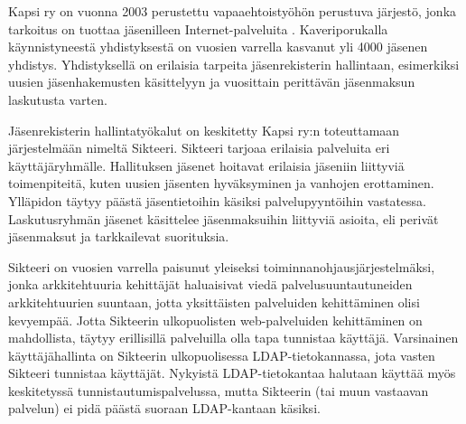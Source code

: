 Kapsi ry on vuonna 2003 perustettu vapaaehtoistyöhön perustuva järjestö, jonka tarkoitus on tuottaa jäsenilleen Internet-palveluita \cite{kapsifi}. Kaveriporukalla käynnistyneestä yhdistyksestä on vuosien varrella kasvanut yli 4000 jäsenen yhdistys. Yhdistyksellä on erilaisia tarpeita jäsenrekisterin hallintaan, esimerkiksi uusien jäsenhakemusten käsittelyyn ja vuosittain perittävän jäsenmaksun laskutusta varten.

Jäsenrekisterin hallintatyökalut on keskitetty Kapsi ry:n toteuttamaan järjestelmään nimeltä Sikteeri. Sikteeri tarjoaa erilaisia palveluita eri käyttäjäryhmälle. Hallituksen jäsenet hoitavat erilaisia jäseniin liittyviä toimenpiteitä, kuten uusien jäsenten hyväksyminen ja vanhojen erottaminen. Ylläpidon täytyy päästä jäsentietoihin käsiksi palvelupyyntöihin vastatessa. Laskutusryhmän jäsenet käsittelee jäsenmaksuihin liittyviä asioita, eli perivät jäsenmaksut ja tarkkailevat suorituksia.

Sikteeri on vuosien varrella paisunut yleiseksi toiminnanohjausjärjestelmäksi, jonka arkkitehtuuria kehittäjät haluaisivat viedä palvelusuuntautuneiden arkkitehtuurien suuntaan, jotta yksittäisten palveluiden kehittäminen olisi kevyempää. Jotta Sikteerin ulkopuolisten web-palveluiden kehittäminen on mahdollista, täytyy erillisillä palveluilla olla tapa tunnistaa käyttäjä. Varsinainen käyttäjähallinta on Sikteerin ulkopuolisessa LDAP-tietokannassa, jota vasten Sikteeri tunnistaa käyttäjät. Nykyistä LDAP-tietokantaa halutaan käyttää myös keskitetyssä tunnistautumispalvelussa, mutta Sikteerin (tai muun vastaavan palvelun) ei pidä päästä suoraan LDAP-kantaan käsiksi.